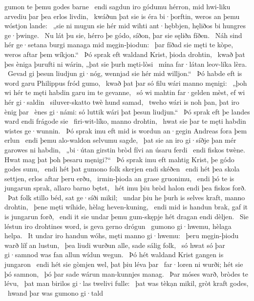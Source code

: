 gumon te þemu godes barne \hld\ endi sagdun iro gódumu hérron,
mid hwi-liku arvediu þar þea erlos livdin, \hld\ kwáðun þat sie is éra bi·þorftin,
weros an þemu wóstjon lande: \hld\ „sie ni mugun sie hér mid wihti ant·hębbjen,
hęliðos bi hungres ge·þwinge. \hld\ Nu lát þu sie, hérro þe gódo,
síðon, þar sie sęliða fíðen. \hld\ Náh sind hér ge·setana burgi
managa mid męgin-þiodun: \hld\ þar fíðad sie męti te kòpe,
weros aftar þem wíkjon.“ \hld\ Þó sprak eft waldand Krist,
þioda drohtin, \hld\ kwað þat þes èniga þurufti ni wárin,
„þat sie þurh męti-lòsi \hld\ mína far·látan
leov-líka lèra. \hld\ Gevad gi þesun liudjun gi·nóg,
wennjad sie hér mid willjon.“ \hld\ Þó habde eft is word garu
Philippus fród gumo, \hld\ kwað þat þar só filu wári
manno męnigi: \hld\ „þoh wi hér te męti habdin
garu im te gevanne, \hld\ só wi mahtin far·gelden mèst,
ef wi hér gi·saldin \hld\ siluver-skatto
twè hund samad, \hld\ tweho wári is noh þan,
þat iro ènig þar \hld\ ènes gi·námi:
só luttik wári þat þesun liudjun.“ \hld\ Þó sprak eft þe landes ward
endi frágode sie \hld\ firi-wit-líko,
manno drohtin, \hld\ hwat sie þar te męti habdin
wistes ge·wunnin. \hld\ Þó sprak imu eft mid is wordun an·gegin
Andreas fora þem erlun \hld\ endi þemu alo-waldon
selvumu sagde, \hld\ þat sie an iro gi·síðje þan mér
garowes ni habdin, \hld\ „bi·útan girstin bròd
fívi an úsaru ferdi \hld\ endi fiskos twène.
Hwat mag þat þoh þesaru męnigi?“ \hld\ Þó sprak imu eft mahtig Krist,
þe gódo godes sunu, \hld\ endi hét þat gumono folk
skerjen endi skéðen \hld\ endi hét þea skola settjen,
erlos aftar þeru erðu, \hld\ irmin-þioda
an grase gruonimu, \hld\ endi þó te is jungarun sprak,
allaro barno bętst, \hld\ hét imu þiu bròd halon
endi þea fiskos forð. \hld\ Þat folk stillo béd,
sat ge·síði mikil; \hld\ undar þiu he þurh is selves kraft,
manno drohtin, \hld\ þene męti wíhide,
hèlag heven-kuning, \hld\ endi mid is handun brak,
gaf it is jungarun forð, \hld\ endi it sie undar þemu gum-skępje hét
dragan endi dèljen. \hld\ Sie léstun iro drohtines word,
is geva gerno drógun \hld\ gumono gi·hwemu,
hèlaga helpa. \hld\ It undar iro handun wóhs,
męti manno gi·hwemu: \hld\ þeru męgin-þiodu warð
líf an lustun, \hld\ þea liudi wurðun alle,
sade sálig folk, \hld\ só hwat só þar gi·samnod was
fan allun wídun wegun. \hld\ Þó hét waldand Krist
gangen is jungaron \hld\ endi hét sie gòmjen wel,
þat þiu léva þar \hld\ far·loren ni wurði;
hét sie þó samnon, \hld\ þó þar sade wárun
man-kunnjes manag. \hld\ Þar móses warð,
bròdes te lévu, \hld\ þat man birilos gi·las
twelivi fulle: \hld\ þat was tèkạn mikil,
gròt kraft godes, \hld\ hwand þar was gumono gi·tald
